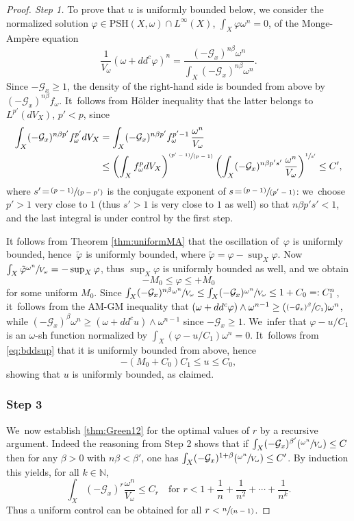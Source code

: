\documentclass[11pt]{article}
\numberwithin{equation}{section}
\newcommand{\Psfrac}[2]{(\sfrac{#1}{#2})}
\newcommand{\spfrac}[2]{\sfrac{#1}{(#2)}}
\newcommand{\pspfrac}[2]{\sfrac{(#1)}{(#2)}}
\theoremstyle{definition}
\newcommand{\N}{\mathbb N}
\let\f\varphi
\newcommand \PSH {\mathrm{PSH}}
\begin{document}
\begin{proof}[Proof. Step 1]
To prove that $u$ is uniformly bounded below, we
consider the normalized solution $\f \in\PSH(X,\omega) \cap L^{\infty}(X)$, $\int_X \f \omega^n=0$,
of the Monge-Ampère equation
\[
\frac{1}{V_{\omega}} (\omega+dd^c \f)^n = \frac{(-{\mathcal G}_x)^{n\beta} \omega^n}{\int_X (-{\mathcal G}_x)^{n\beta} \omega^n}.
\]
Since $-{\mathcal G}_x \geq 1$, the density of the right-hand side is bounded from above by $(-{\mathcal G}_x)^{n\beta} f_{\omega}$. It~follows from Hölder inequality that the latter belongs to $L^{p'}(dV_X)$, $p'<p$, since
\begin{align*}
\int_X (-{\mathcal G}_x)^{n\beta p'} f_{\omega}^{p'} dV_X
&= \int_X (-{\mathcal G}_x)^{n\beta p'} f_{\omega}^{p'-1}\, \frac{\omega^n}{V_{\omega}} \\
&\leq  \left( \int_X f_{\omega}^p dV_X \right)^{\pspfrac{p'-1}{p-1}}
\left( \int_X (-{\mathcal G}_x)^{n\beta p's'}\, \frac{\omega^n}{V_{\omega}} \right)^{\sfrac{1}{s'}}
\leq C',
\end{align*}
where $s'\!=\!\pspfrac{p-1}{p-p'}$ is the conjugate exponent of $s\!=\!\pspfrac{p-1}{p'-1}$:
we~choose $p'>1$ very close to $1$ (thus $s'>1$ is very close to $1$ as well) so that
$n\beta p' s'<1$, and the last integral is under control by the first step.

It follows from Theorem \ref{thm:uniformMA} that the oscillation of~$\f$ is uniformly bounded,
hence~$\tilde{\f}$ is uniformly bounded, where $\tilde{\f}=\f-\sup_X \f$.
Now $\int_X \tilde{\f} \sfrac{\omega^n}{V_{\omega}}=-\sup_X \f$, thus $\sup_X \f$ is uniformly bounded as well,
and we obtain
\[
-M_0 \leq \f \leq +M_0
\]
for some uniform $M_0$.
Since $\int_X (-{\mathcal G}_x)^{n\beta} \sfrac{\omega^n}{V_{\omega}}
\leq \int_X (-{\mathcal G}_x) \sfrac{\omega^n}{V_{\omega}} \leq 1+C_0=:C_1^n$, it~follows from the AM-GM inequality that $(\omega+dd^c \f) \wedge \omega^{n-1} \geq \Psfrac{(-{\mathcal G}_x)^{\beta}}{C_1} \omega^n$,
while $ (-{\mathcal G}_x)^{\beta} \omega^n \geq (\omega+dd^c u) \wedge \omega^{n-1}$ since $-{\mathcal G}_x \geq 1$. We~infer that $\f-u/C_1$ is an $\omega$-sh function
normalized by $\int_X (\f-u/C_1) \omega^n=0$. It~follows from \eqref{eq:bddsup} that
it is uniformly bounded from above, hence
\[
-(M_0+C_0)C_1 \leq u \leq C_0,
\]
showing that $u$ is uniformly bounded, as claimed.

\subsubsection*{Step 3}
We~now establish \eqref{thm:Green12} for the optimal values of $r$ by a recursive argument.
Indeed the reasoning from Step 2 shows that if $\int_X (-{\mathcal G}_x)^{\beta'} \Psfrac{\omega^n}{V_{\omega}} \leq C$
then for any $\beta>0$ with $n\beta < \beta'$, one has $\int_X (-{\mathcal G}_x)^{1+\beta} \Psfrac{\omega^n}{V_{\omega}} \leq C'$.
By induction this yields, for all $k \in \N$,
\[
\int_X (-{\mathcal G}_x)^{r} \frac{\omega^n}{V_{\omega}} \leq C_r
\quad \text{for }
r<1+\frac{1}{n}+\frac{1}{n^2}+\cdots+\frac{1}{n^k}.
\]
Thus a uniform control can be obtained for all $r<\spfrac{n}{n-1}$.


\end{proof}
\end{document}

